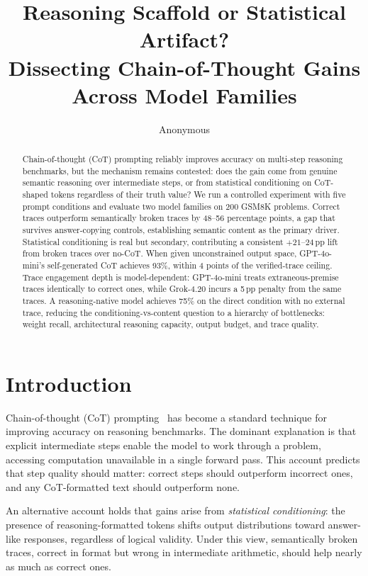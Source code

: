 \documentclass[11pt]{article}
\title{Reasoning Scaffold or Statistical Artifact?\\
       Dissecting Chain-of-Thought Gains Across Model Families}
\author{Anonymous}
\date{}
\begin{document}
\maketitle

\begin{abstract}
Chain-of-thought (CoT) prompting reliably improves accuracy on multi-step reasoning benchmarks,
but the mechanism remains contested: does the gain come from genuine semantic reasoning over
intermediate steps, or from statistical conditioning on CoT-shaped tokens regardless of their
truth value? We run a controlled experiment with five prompt conditions and evaluate two model
families on 200 GSM8K problems. Correct traces outperform semantically broken traces by 48--56
percentage points, a gap that survives answer-copying controls, establishing semantic content
as the primary driver. Statistical conditioning is real but secondary, contributing a consistent
$+21$--$24$\,pp lift from broken traces over no-CoT. When given unconstrained output space,
GPT-4o-mini's self-generated CoT achieves 93\%, within 4 points of the verified-trace ceiling.
Trace engagement depth is model-dependent: GPT-4o-mini treats extraneous-premise traces
identically to correct ones, while Grok-4.20 incurs a 5\,pp penalty from the same traces. A
reasoning-native model achieves 75\% on the direct condition with no external trace, reducing
the conditioning-vs-content question to a hierarchy of bottlenecks: weight recall, architectural
reasoning capacity, output budget, and trace quality.
\end{abstract}

\section{Introduction}

Chain-of-thought (CoT) prompting~\citep{wei2022chain} has become a standard technique for
improving accuracy on reasoning benchmarks. The dominant explanation is that explicit
intermediate steps enable the model to work through a problem, accessing computation
unavailable in a single forward pass. This account predicts that step quality should matter:
correct steps should outperform incorrect ones, and any CoT-formatted text should outperform
none.

An alternative account holds that gains arise from \emph{statistical conditioning}: the
presence of reasoning-formatted tokens shifts output distributions toward answer-like
responses, regardless of logical validity. Under this view, semantically broken traces,
correct in format but wrong in intermediate arithmetic, should help nearly as much as
correct ones.
\end{document}
